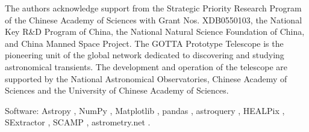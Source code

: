 \documentclass[referee]{raa}
\begin{document}
\begin{acknowledgements}
The authors acknowledge support from the Strategic Priority Research Program of the Chinese Academy of Sciences with Grant Nos. XDB0550103, the National Key R\&D Program of China, the National Natural Science Foundation of China, and China Manned Space Project. The GOTTA Prototype Telescope is the pioneering unit of the global network dedicated to discovering and studying astronomical transients. The development and operation of the telescope are supported by the National Astronomical Observatories, Chinese Academy of Sciences and the University of Chinese Academy of Sciences.
\end{acknowledgements}

Software: Astropy \citep{Astropy2013,Astropy2018,Astropy2022}, NumPy \citep{Harris2020}, Matplotlib \citep{Hunter2007}, pandas \citep{McKinney2010}, astroquery \citep{Ginsburg2019}, HEALPix \citep{Gorski2005}, SExtractor \citep{Bertin1996}, SCAMP \citep{Bertin2006}, astrometry.net \citep{Lang2010}.
\end{document}
